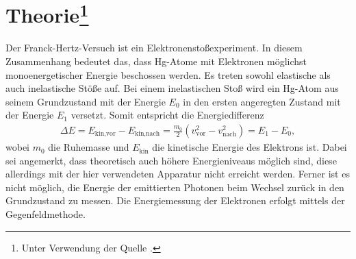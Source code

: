 \section[Theorie]{{Theorie\footnote{Unter Verwendung der Quelle \cite{man:v601}.}}}

Der Franck-Hertz-Versuch ist ein Elektronenstoßexperiment. 
In diesem Zusammenhang bedeutet das, dass Hg-Atome mit Elektronen möglichst monoenergetischer Energie beschossen werden.
Es treten sowohl elastische als auch inelastische Stöße auf.
Bei einem inelastischen Stoß wird ein Hg-Atom aus seinem Grundzustand mit der Energie $E_0$ in den ersten angeregten Zustand mit der Energie $E_1$ versetzt.
Somit entspricht die Energiedifferenz 
\begin{align}
    \Delta E = E_{\text{kin,vor}} - E_{\text{kin,nach}} = \frac{m_0}{2} \left(v^2_\text{vor} -v^2_\text{nach}\right) = E_1 - E_0,
    \label{eq:energiedifferenz}
\end{align}
wobei $m_0$ die Ruhemasse und $E_\text{kin}$ die kinetische Energie des Elektrons ist.
Dabei sei angemerkt, dass theoretisch auch höhere Energieniveaus möglich sind, diese allerdings mit der hier verwendeten Apparatur nicht erreicht werden.
Ferner ist es nicht möglich, die Energie der emittierten Photonen beim Wechsel zurück in den Grundzustand zu messen.
Die Energiemessung der Elektronen erfolgt mittels der Gegenfeldmethode.



